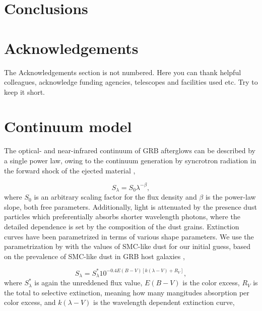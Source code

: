 \documentclass[a4paper,fleqn,usenatbib]{mnras}
\begin{document}
\section{Conclusions}



\section*{Acknowledgements}

The Acknowledgements section is not numbered. Here you can thank helpful
colleagues, acknowledge funding agencies, telescopes and facilities used etc.
Try to keep it short.






\newpage
\appendix

\section{Continuum model}
The optical- and near-infrared continuum of GRB afterglows can be described by a single power law, owing to the continuum generation by syncrotron radiation in the forward shock of the ejected material \citep{Piran2004, Kumar2015},

\begin{equation} 
S_\lambda = S_{0} \lambda^{-\beta},
\end{equation}
where $S_0$ is an arbitrary scaling factor for the flux density and $\beta$ is the power-law slope, both free parameters. 
Additionally, light is attenuated by the presence dust particles which preferentially absorbs shorter wavelength photons, where the detailed dependence is set by the composition of the dust grains. Extinction curves have been parametrized in terms of various shape parameters. We use the parametrization by \citet{Fitzpatrick2007} with the values of SMC-like dust \citep{Gordon2003} for our initial guess, based on the prevalence of SMC-like dust in GRB host galaxies \citep{Japelj2015},

\begin{equation} 
S_\lambda = S_\lambda^*   10 ^{-0.4 E(B-V)[k(\lambda - V) + R_V]},
\end{equation}
where $S_\lambda^*$ is again the unreddened flux value, $E(B-V)$ is the color excess, $R_V$ is the total to selective extinction, meaning how many mangitudes absorption per color excess, and $k(\lambda - V)$ is the wavelength dependent extinction curve,
\end{document}
